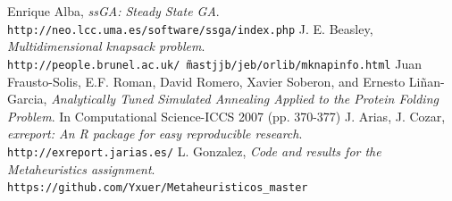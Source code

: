 \documentclass{article}[12pt]
\begin{document}
	\begin{thebibliography}{9}
		 Enrique Alba, \textit{ssGA: Steady State GA}. \texttt{http://neo.lcc.uma.es/software/ssga/index.php}
		 J. E. Beasley, \textit{Multidimensional knapsack problem}. \texttt{http://people.brunel.ac.uk/\~ \ mastjjb/jeb/orlib/mknapinfo.html}
		 Juan Frausto-Solis, E.F. Roman, David Romero, Xavier Soberon, and Ernesto Liñan-Garcia, \textit{Analytically Tuned Simulated Annealing Applied to the Protein Folding Problem}. In Computational Science-ICCS 2007 (pp. 370-377)
		 J. Arias, J. Cozar, \textit{exreport: An R package for easy reproducible research}. \texttt{http://exreport.jarias.es/}
		 L. Gonzalez, \textit{Code and results for the Metaheuristics assignment}. \texttt{https://github.com/Yxuer/Metaheuristicos\_master}
	\end{thebibliography}
	
\end{document}

